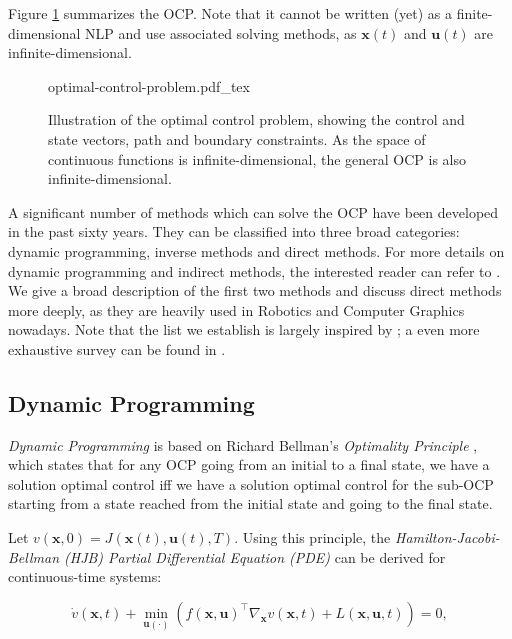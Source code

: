 Figure \ref{fig:chap3-optimal-control-problem} summarizes the
OCP. Note that it cannot be written (yet) as a finite-dimensional NLP
and use associated solving methods, as $\mathbf{x}(t)$ and
$\mathbf{u}(t)$ are infinite-dimensional.

\begin{figure}
  \centering
      {\def\svgwidth{0.9\linewidth}
        
                   {optimal-control-problem.pdf_tex}
      }
      \caption{Illustration of the optimal control problem, showing
        the control and state vectors, path and boundary
        constraints. As the space of continuous functions is
        infinite-dimensional, the general OCP is also
        infinite-dimensional.}
      \label{fig:chap3-optimal-control-problem}
\end{figure}

A significant number of methods which can solve the OCP have been
developed in the past sixty years. They can be classified into three
broad categories: dynamic programming, inverse methods and direct
methods. For more details on dynamic programming and indirect methods,
the interested reader can refer to \cite{laumond1998robot,
  todorov2006optimal}. We give a broad description of the first two
methods and discuss direct methods more deeply, as they are heavily
used in Robotics and Computer Graphics nowadays. Note that the list we
establish is largely inspired by \cite{diehl2006fast}; a even more
exhaustive survey can be found in
\cite{betts1998survey,betts2010practical}.

\subsection{Dynamic Programming}

\emph{Dynamic Programming} is based on Richard Bellman's
\emph{Optimality Principle} \cite{bellman1965dynamic}, which states
that for any OCP going from an initial to a final state, we have a
solution optimal control iff we have a solution optimal control for
the sub-OCP starting from a state reached from the initial state and
going to the final state.

Let $v(\mathbf{x},0) = J(\mathbf{x}(t),\mathbf{u}(t),T)$. Using this
principle, the \emph{Hamilton-Jacobi-Bellman (HJB) Partial
  Differential Equation (PDE)} can be derived for continuous-time
systems:

\begin{equation}
\label{eq:chap3-hjb}
\dot{v}(\mathbf{x},t) + \min_{\mathbf{u} (\cdot)}\left(f(\mathbf{x},
\mathbf{u})^{\top}\nabla_{\mathbf{x}} v(\mathbf{x},t) + L (\mathbf{x},
\mathbf{u},t)\right) = 0,
\end{equation}

